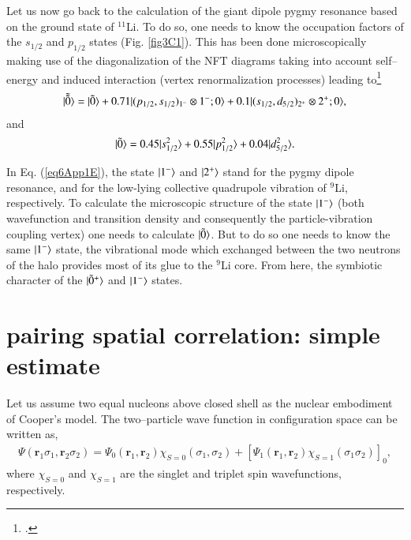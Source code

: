\begin{subappendices}
Let us now go back to the calculation of the giant dipole pygmy resonance based on the ground state of $^{11}$Li. To do so, one needs to know the occupation factors of the $s_{1/2}$ and $p_{1/2}$ states (Fig. \ref{fig3C1}). This has been done microscopically making use of the diagonalization of the NFT diagrams taking into account self--energy and induced interaction (vertex renormalization processes) leading to\footnote{\cite{Barranco:01}.}
\begin{align}\label{eq6App1E}
|{\tilde {\tilde 0}} \rangle=|{\tilde 0} \rangle+0.71|{(p_{1/2},s_{1/2})_{1^-}\otimes1^-;0} \rangle+0.1|{(s_{1/2},d_{5/2})_{2^+}\otimes2^+;0} \rangle,
\end{align}
and 
\begin{align}\label{eq7App1E}
|{\tilde 0} \rangle=0.45|{s_{1/2}^2} \rangle+0.55|{p_{1/2}^2} \rangle+0.04|{d_{5/2}^2} \rangle.
\end{align}

In Eq. (\ref{eq6App1E}), the state $|{1^-} \rangle$ and $|{2^+} \rangle$ stand for the  pygmy dipole resonance, and for the low-lying collective quadrupole vibration of $^9$Li, respectively.  To calculate the microscopic structure of the state $|{1^-} \rangle$ (both wavefunction and transition density and consequently the particle-vibration coupling vertex) one needs to calculate $|{\tilde 0} \rangle$. But to do so one needs to know the same $|{1^-} \rangle$ state, the vibrational mode which exchanged between the two neutrons of the halo provides most of its glue to the $^9$Li core. From here, the symbiotic character of the $|{\tilde 0^+} \rangle$ and $|{1^-} \rangle$ states. 
 
\section{pairing spatial correlation: simple estimate}\label{app3D}
Let us assume two equal nucleons above closed shell as the nuclear embodiment of Cooper's model. The two--particle wave function in configuration space can be written as,
\begin{align}\label{eq1App3E}
\Psi(\mathbf r_1\sigma_1,\mathbf r_2\sigma_2)=\Psi_0(\mathbf r_1,\mathbf r_2)\chi_{S=0}(\sigma_1,\sigma_2)+\left[\Psi_1(\mathbf r_1,\mathbf r_2)\chi_{S=1}(\sigma_1\sigma_2)\right]_0,
\end{align}
where $\chi_{S=0}$ and $\chi_{S=1}$ are the singlet and triplet spin wavefunctions, respectively.


\end{subappendices}
